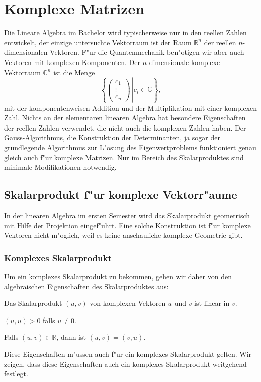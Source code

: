\section{Komplexe Matrizen}
%
Die Lineare Algebra im Bachelor wird typischerweise nur in den
reellen Zahlen entwickelt, der einzige untersuchte Vektorraum ist
der Raum $\mathbb R^n$ der reellen $n$-dimensionalen Vektoren.
F"ur die Quantenmechanik ben"otigen wir aber auch Vektoren mit
komplexen Komponenten. Der $n$-dimensionale komplexe Vektorraum
$\mathbb C^n$ ist die Menge
\[
\left\{\left.\begin{pmatrix}c_1\\\vdots\\c_n\end{pmatrix}\,\right|
c_i\in\mathbb C\right\},
\]
mit der komponentenweisen Addition und der Multiplikation mit einer
komplexen Zahl. Nichts an der elementaren linearen Algebra hat besondere
Eigenschaften der reellen Zahlen verwendet, die nicht auch die komplexen
Zahlen haben. Der Gauss-Algorithmus, die Konstruktion der Determinanten,
ja sogar der grundlegende Algorithmus zur L"osung des Eigenwertproblems
funktioniert genau gleich auch f"ur komplexe Matrizen. Nur im Bereich
des Skalarproduktes sind minimale Modifikationen notwendig.

\subsection{Skalarprodukt f"ur komplexe Vektorr"aume}
In der linearen Algebra im ersten Semester wird das Skalarprodukt
geometrisch mit Hilfe der Projektion eingef"uhrt.
Eine solche Konstruktion ist f"ur komplexe Vektoren nicht m"oglich,
weil es keine anschauliche komplexe Geometrie gibt.

\subsubsection{Komplexes Skalarprodukt}
Um ein komplexes Skalarprodukt zu bekommen, gehen wir daher von den
algebraischen Eigenschaften des Skalarproduktes aus:
\begin{compactenum}
\item Das Skalarprodukt $(u,v)$ von komplexen Vektoren $u$ und $v$ ist linear
in $v$.
\item $(u,u) > 0$ falls $u\ne 0$.
\item Falls $(u,v)\in\mathbb R$, dann ist $(u,v)=(v,u)$.
\end{compactenum}
Diese Eigenschaften m"ussen auch f"ur ein komplexes Skalarprodukt gelten.
Wir zeigen, dass diese Eigenschaften auch ein komplexes Skalarprodukt 
weitgehend festlegt.

